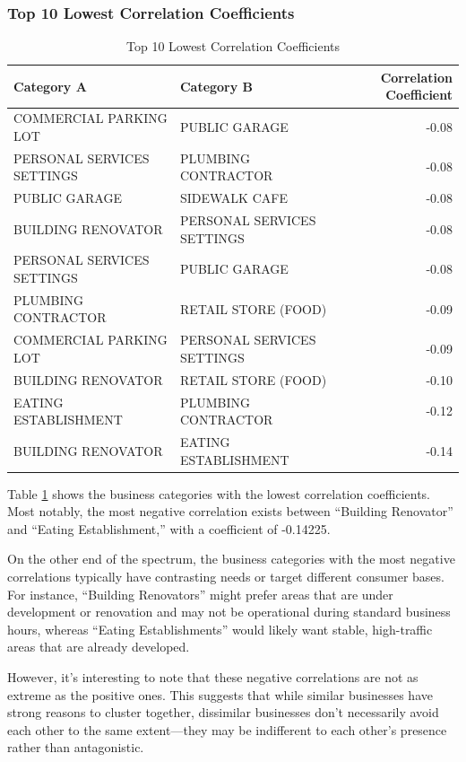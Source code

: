 \documentclass[
]{article}
\begin{document}
\hypertarget{top-10-lowest-correlation-coefficients}{%
\subsubsection{Top 10 Lowest Correlation Coefficients}\label{top-10-lowest-correlation-coefficients}}

\begin{table}[H]

\caption{\label{tab:bottom10}Top 10 Lowest Correlation Coefficients}
\centering
\fontsize{10}{12}\selectfont
\begin{tabular}[t]{llr}
\toprule
Category A & Category B & Correlation Coefficient\\
\midrule
COMMERCIAL PARKING LOT & PUBLIC GARAGE & -0.08\\
PERSONAL SERVICES SETTINGS & PLUMBING CONTRACTOR & -0.08\\
PUBLIC GARAGE & SIDEWALK CAFE & -0.08\\
BUILDING RENOVATOR & PERSONAL SERVICES SETTINGS & -0.08\\
PERSONAL SERVICES SETTINGS & PUBLIC GARAGE & -0.08\\
PLUMBING CONTRACTOR & RETAIL STORE (FOOD) & -0.09\\
COMMERCIAL PARKING LOT & PERSONAL SERVICES SETTINGS & -0.09\\
BUILDING RENOVATOR & RETAIL STORE (FOOD) & -0.10\\
EATING ESTABLISHMENT & PLUMBING CONTRACTOR & -0.12\\
BUILDING RENOVATOR & EATING ESTABLISHMENT & -0.14\\
\bottomrule
\end{tabular}
\end{table}

Table \ref{tab:bottom10} shows the business categories with the lowest correlation coefficients. Most notably, the most negative correlation exists between ``Building Renovator'' and ``Eating Establishment,'' with a coefficient of -0.14225.

On the other end of the spectrum, the business categories with the most negative correlations typically have contrasting needs or target different consumer bases. For instance, ``Building Renovators'' might prefer areas that are under development or renovation and may not be operational during standard business hours, whereas ``Eating Establishments'' would likely want stable, high-traffic areas that are already developed.

However, it's interesting to note that these negative correlations are not as extreme as the positive ones. This suggests that while similar businesses have strong reasons to cluster together, dissimilar businesses don't necessarily avoid each other to the same extent---they may be indifferent to each other's presence rather than antagonistic.
\end{document}
